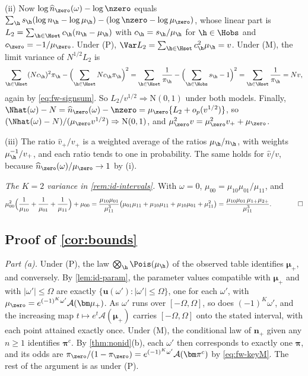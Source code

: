 (ii) Now $\log\widehat n_{\zero}(\omega)-\log\nzero$ equals $\sum_{\h}s_{\h}(\log n_{\h}-\log\mu_{\h})-(\log\nzero-\log\mu_{\zero})$, whose linear part is $L_2=\sum_{\h\in\Hset}c_{\h}(n_{\h}-\mu_{\h})$ with $c_{\h}=s_{\h}/\mu_{\h}$ for $\h\in\Hobs$ and $c_{\zero}=-1/\mu_{\zero}$. Under (P), $\Var L_2=\sum_{\h\in\Hset}c_{\h}^2\mu_{\h}=v$. Under (M), the limit variance of $N^{1/2}L_2$ is
\[
  \sum_{\h\in\Hset}(Nc_{\h})^2\pi_{\h}-\Bigl(\sum_{\h\in\Hset}Nc_{\h}\pi_{\h}\Bigr)^2
  =\sum_{\h\in\Hset}\frac1{\pi_{\h}}-\Bigl(\sum_{\h\in\Hobs}s_{\h}-1\Bigr)^2=\sum_{\h\in\Hset}\frac1{\pi_{\h}}=Nv,
\]
again by \eqref{eq:fw-signsum}. So $L_2/v^{1/2}\Rightarrow\mathrm N(0,1)$ under both models. Finally, $\Nhat(\omega)-N=\widehat n_{\zero}(\omega)-\nzero=\mu_{\zero}\{L_2+o_p(v^{1/2})\}$, so $(\Nhat(\omega)-N)/(\mu_{\zero}v^{1/2})\Rightarrow\mathrm N(0,1)$, and $\mu_{\zero}^2v=\mu_{\zero}^2v_++\mu_{\zero}$.

(iii) The ratio $\widehat v_+/v_+$ is a weighted average of the ratios $\mu_{\h}/n_{\h}$, with weights $\mu_{\h}^{-1}/v_+$, and each ratio tends to one in probability. The same holds for $\widehat v/v$, because $\widehat n_{\zero}(\omega)/\mu_{\zero}\to1$ by (i).

\emph{The $K=2$ variance in \cref{rem:id-intervals}.} With $\omega=0$, $\mu_{00}=\mu_{10}\mu_{01}/\mu_{11}$, and
\[
  \mu_{00}^2\Bigl(\frac1{\mu_{10}}+\frac1{\mu_{01}}+\frac1{\mu_{11}}\Bigr)+\mu_{00}
  =\frac{\mu_{10}\mu_{01}}{\mu_{11}^3}\bigl(\mu_{01}\mu_{11}+\mu_{10}\mu_{11}+\mu_{10}\mu_{01}+\mu_{11}^2\bigr)
  =\frac{\mu_{10}\mu_{01}\,\mu_{1+}\mu_{2+}}{\mu_{11}^3}. \qquad\qed
\]

\subsection{Proof of \texorpdfstring{\cref{cor:bounds}}{the bounds corollary}}\label{app:id-bounds}

\emph{Part (a).} Under (P), the law $\bigotimes_{\h}\Pois(\mu_{\h})$ of the observed table identifies $\bm\mu_+$, and conversely. By \cref{lem:id-param}, the parameter values compatible with $\bm\mu_+$ and with $|\omega'|\le\Omega$ are exactly $\{\bm u(\omega'):|\omega'|\le\Omega\}$, one for each $\omega'$, with $\mu_{\zero}=e^{(-1)^K\omega'}\mathcal A(\bm\mu_+)$. As $\omega'$ runs over $[-\Omega,\Omega]$, so does $(-1)^K\omega'$, and the increasing map $t\mapsto e^t\mathcal A(\bm\mu_+)$ carries $[-\Omega,\Omega]$ onto the stated interval, with each point attained exactly once. Under (M), the conditional law of $\bm n_+$ given any $n\ge1$ identifies $\bm\pi^c$. By \cref{thm:nonid}(b), each $\omega'$ then corresponds to exactly one $\bm\pi$, and its odds are $\pi_{\zero}/(1-\pi_{\zero})=e^{(-1)^K\omega'}\mathcal A(\bm\pi^c)$ by \eqref{eq:fw-keyM}. The rest of the argument is as under (P).

